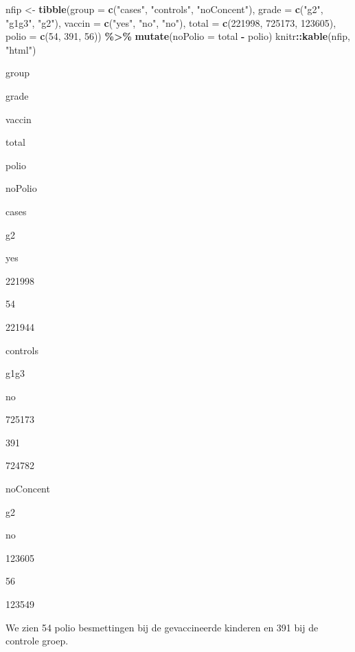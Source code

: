 \documentclass[
  12pt,dutch,coursenotes]{book}
\newenvironment{Shaded}{\begin{snugshade}}{\end{snugshade}}
\newcommand{\DataTypeTok}[1]{\textcolor[rgb]{0.13,0.29,0.53}{#1}}
\newcommand{\DecValTok}[1]{\textcolor[rgb]{0.00,0.00,0.81}{#1}}
\newcommand{\KeywordTok}[1]{\textcolor[rgb]{0.13,0.29,0.53}{\textbf{#1}}}
\newcommand{\NormalTok}[1]{#1}
\newcommand{\OperatorTok}[1]{\textcolor[rgb]{0.81,0.36,0.00}{\textbf{#1}}}
\newcommand{\StringTok}[1]{\textcolor[rgb]{0.31,0.60,0.02}{#1}}
\theoremstyle{definition}
\theoremstyle{definition}
\theoremstyle{definition}
\theoremstyle{remark}
\begin{document}
\begin{Shaded}
\begin{Highlighting}[]
\NormalTok{nfip \textless{}{-}}\StringTok{ }\KeywordTok{tibble}\NormalTok{(}\DataTypeTok{group =} \KeywordTok{c}\NormalTok{(}\StringTok{"cases"}\NormalTok{, }\StringTok{"controls"}\NormalTok{, }\StringTok{"noConcent"}\NormalTok{), }
    \DataTypeTok{grade =} \KeywordTok{c}\NormalTok{(}\StringTok{"g2"}\NormalTok{, }\StringTok{"g1g3"}\NormalTok{, }\StringTok{"g2"}\NormalTok{), }\DataTypeTok{vaccin =} \KeywordTok{c}\NormalTok{(}\StringTok{"yes"}\NormalTok{, }
        \StringTok{"no"}\NormalTok{, }\StringTok{"no"}\NormalTok{), }\DataTypeTok{total =} \KeywordTok{c}\NormalTok{(}\DecValTok{221998}\NormalTok{, }\DecValTok{725173}\NormalTok{, }\DecValTok{123605}\NormalTok{), }
    \DataTypeTok{polio =} \KeywordTok{c}\NormalTok{(}\DecValTok{54}\NormalTok{, }\DecValTok{391}\NormalTok{, }\DecValTok{56}\NormalTok{)) }\OperatorTok{\%\textgreater{}\%}\StringTok{ }\KeywordTok{mutate}\NormalTok{(}\DataTypeTok{noPolio =}\NormalTok{ total }\OperatorTok{{-}}\StringTok{ }
\StringTok{    }\NormalTok{polio)}
\NormalTok{knitr}\OperatorTok{::}\KeywordTok{kable}\NormalTok{(nfip, }\StringTok{"html"}\NormalTok{)}
\end{Highlighting}
\end{Shaded}

group

grade

vaccin

total

polio

noPolio

cases

g2

yes

221998

54

221944

controls

g1g3

no

725173

391

724782

noConcent

g2

no

123605

56

123549

We zien 54 polio besmettingen bij de gevaccineerde kinderen
en 391 bij de controle groep.
\end{document}
